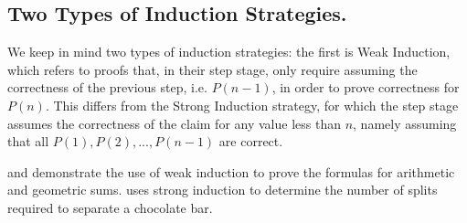 \subsection{Two Types of Induction Strategies.}
We keep in mind two types of induction strategies: the first is Weak Induction, which refers to proofs that, in their step stage, only require assuming the correctness of the previous step, i.e. $P(n-1)$, in order to prove correctness for $P(n)$. This differs from the Strong Induction strategy, for which the step stage assumes the correctness of the claim for any value less than $n$, namely assuming that all $P(1), P(2), ..., P(n-1)$ are correct.


 and  demonstrate the use of weak induction to prove the formulas for arithmetic and geometric sums.  uses strong induction to determine the number of splits required to separate a chocolate bar.

